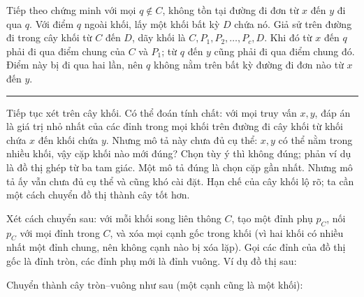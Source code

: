 \documentclass[11pt]{article}
\newcommand{\qedmark}{\hfill\rule{0.7ex}{0.7ex}}
\begin{document}
Tiếp theo chứng minh với mọi \(q\notin C\), không tồn tại đường đi đơn từ \(x\)
đến \(y\) đi qua \(q\). Với điểm \(q\) ngoài khối, lấy một khối bất kỳ \(D\)
chứa nó. Giả sử trên đường đi trong cây khối từ \(C\) đến \(D\), dãy khối là
\(C,P_1,P_2,\ldots,P_c,D\). Khi đó từ \(x\) đến \(q\) phải đi qua điểm chung
của \(C\) và \(P_1\); từ \(q\) đến \(y\) cũng phải đi qua điểm chung đó. Điểm
này bị đi qua hai lần, nên \(q\) không nằm trên bất kỳ đường đi đơn nào từ
\(x\) đến \(y\). \qedmark

Tiếp tục xét trên cây khối. Có thể đoán tính chất: với mọi truy vấn \(x,y\),
đáp án là giá trị nhỏ nhất của các đỉnh trong mọi khối trên đường đi cây khối
từ khối chứa \(x\) đến khối chứa \(y\). Nhưng mô tả này chưa đủ cụ thể:
\(x,y\) có thể nằm trong nhiều khối, vậy cặp khối nào mới đúng? Chọn tùy ý thì
không đúng; phản ví dụ là đồ thị ghép từ ba tam giác. Một mô tả đúng là chọn
cặp gần nhất. Nhưng mô tả ấy vẫn chưa đủ cụ thể và cũng khó cài đặt. Hạn chế
của cây khối lộ rõ; ta cần một cách chuyển đồ thị thành cây tốt hơn.

Xét cách chuyển sau: với mỗi khối song liên thông \(C\), tạo một đỉnh phụ
\(p_C\), nối \(p_C\) với mọi đỉnh trong \(C\), và xóa mọi cạnh gốc trong khối
(vì hai khối có nhiều nhất một đỉnh chung, nên không cạnh nào bị xóa lặp).
Gọi các đỉnh của đồ thị gốc là đỉnh tròn, các đỉnh phụ mới là đỉnh vuông.
Ví dụ đồ thị sau:

\begin{center}
\end{center}

Chuyển thành cây tròn--vuông như sau (một cạnh cũng là một khối):

\begin{center}
\end{center}
\end{document}
